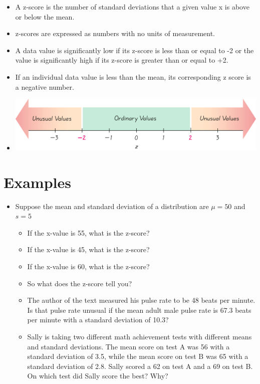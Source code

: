 \documentclass[]{book}
\providecommand{\tightlist}{%
  \setlength{\itemsep}{0pt}\setlength{\parskip}{0pt}}
\begin{document}
\begin{itemize}
\tightlist
\item
  A z-score is the number of standard deviations that a given value x is above or below the mean.
\item
  z-scores are expressed as numbers with no units of measurement.
\item
  A data value is significantly low if its z-score is less than or equal to -2 or the value is significantly high if its z-score is greater than or equal to +2.
\item
  If an individual data value is less than the mean, its corresponding z score is a negative number.
\item
  \includegraphics{pic12.png}
\end{itemize}

\hypertarget{examples}{%
\section{Examples}\label{examples}}

\begin{itemize}
\tightlist
\item
  Suppose the mean and standard deviation of a distribution are \(\mu=50\) and \(s = 5\)

  \begin{itemize}
  \tightlist
  \item
    If the x-value is 55, what is the z-score?
  \item
    If the x-value is 45, what is the z-score?
  \item
    If the x-value is 60, what is the z-score?
  \item
    So what does the z-score tell you?
  \item
    The author of the text measured his pulse rate to be 48 beats per minute. Is that pulse rate unusual if the mean adult male pulse rate is 67.3 beats per minute with a standard deviation of 10.3?
  \item
    Sally is taking two different math achievement tests with different means and standard deviations. The mean score on test A was 56 with a standard deviation of 3.5, while the mean score on test B was 65 with a standard deviation of 2.8. Sally scored a 62 on test A and a 69 on test B. On which test did Sally score the best? Why?
  \end{itemize}
\end{itemize}
\end{document}
